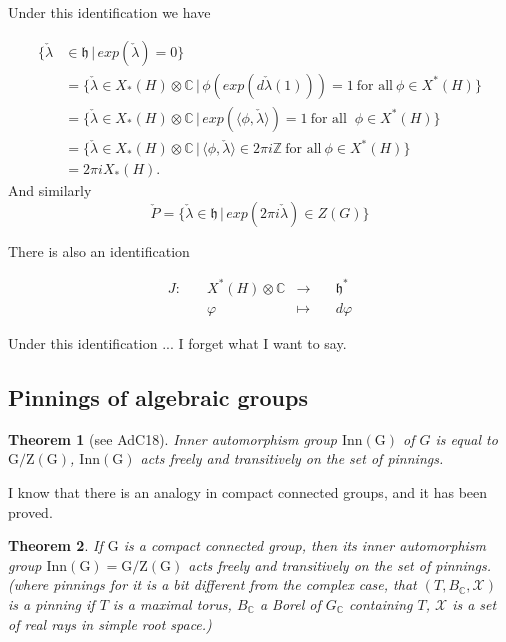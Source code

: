 \documentclass[12pt]{amsart}
\numberwithin{equation}{section}
\newtheorem{thm}{Theorem}[section]
\newcommand{\BC}{{\mathbb {C}}}
\newcommand{\BZ}{{\mathbb {Z}}}
\newcommand{\RG}{{\mathrm {G}}}
\newcommand{\fh}{\mathfrak{h}}
\newcommand{\set}[2]{\{#1\,|\,#2\}}
\newcommand{\defmap}[5]{
           \begin{equation*}
              \begin{aligned}
                   #1:\quad  & #2 &\longrightarrow &\quad #3 \\
                      \quad  & #4    &\longmapsto  &\quad #5
              \end{aligned}
           \end{equation*}
          }
\begin{document}
Under this identification we have

\begin{align*}
  \set{\check{\lambda} & \in \fh}{exp(\check{\lambda})=0}                                                                                                        \\
                       & = \set{\check{\lambda} \in X_*(H)\otimes \BC}{\phi(exp(d \check{\lambda}(1))) = 1 \ \textrm{for all} \ \phi \in X^*(H)}                 \\
                       & = \set{\check{\lambda} \in X_*(H)\otimes \BC}{exp(\langle\phi,\check{\lambda} \rangle) = 1 \ \textrm{for all } \ \phi \in X^*(H)}       \\
                       & = \set{\check{\lambda} \in X_*(H)\otimes \BC}{\langle\phi,\check{\lambda} \rangle \in 2 \pi i \BZ \ \textrm{for all} \ \phi \in X^*(H)} \\
                       & = 2 \pi i X_*(H).
\end{align*}
And similarly
$$\check{P} = \set{\check{\lambda} \in \fh}{exp(2 \pi i \check{\lambda}) \in Z(G)} $$


There is also an identification
\defmap{J}{X^*(H)\otimes \BC}{\fh ^*}{\varphi}{d \varphi}

Under this identification ...  I forget what I want to say.

\subsection{Pinnings of algebraic groups}

\begin{thm}[see AdC18]
  Inner automorphism group $\mathrm{Inn(G)}$ of $G$ is equal to $\mathrm{G/Z(G)}$,
  $\mathrm{Inn(G)}$ acts freely and transitively on the set of pinnings.
\end{thm}


I know that there is an analogy in compact connected groups, and it has been proved.

\begin{thm}
  If $\RG$ is a compact connected group, then its inner automorphism group $\mathrm{Inn(G)} = \mathrm{G/Z(G)}$
  acts freely and transitively on the set of pinnings.
  (where pinnings for it is a bit different from the complex case, that $(T, B_\BC,\mathcal{X})$
  is a pinning if $T$ is a maximal torus, $B_\BC$ a Borel of $G_\BC$ containing $T$, $\mathcal{X}$
  is a set of real rays in simple root space.)
\end{thm}
\end{document}
